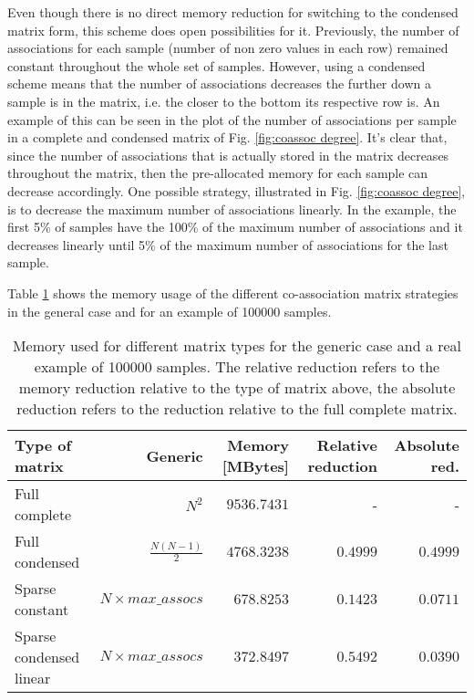 Even though there is no direct memory reduction for switching to the condensed matrix form, this scheme does open possibilities for it.
Previously, the number of associations for each sample (number of non zero values in each row) remained constant throughout the whole set of samples.
However, using a condensed scheme means that the number of associations decreases the further down a sample is in the matrix, i.e. the closer to the bottom its respective row is.
An example of this can be seen in the plot of the number of associations per sample in a complete and condensed matrix of Fig. \ref{fig:coassoc degree}.
It's clear that, since the number of associations that is actually stored in the matrix decreases throughout the matrix, then the pre-allocated memory for each sample can decrease accordingly.
One possible strategy, illustrated in Fig. \ref{fig:coassoc degree}, is to decrease the maximum number of associations linearly.
In the example, the first 5\% of samples have the 100\% of the maximum number of associations and it decreases linearly until 5\% of the maximum number of associations for the last sample.

Table \ref{tab:mat type memory} shows the memory usage of the different co-association matrix strategies in the general case and for an example of 100000 samples.

\begin{table}[hbtp]
\centering
\caption{Memory used for different matrix types for the generic case and a real example of 100000 samples. The relative reduction refers to the memory reduction relative to the type of matrix above, the absolute reduction refers to the reduction relative to the full complete matrix.}
\label{tab:mat type memory}
\begin{tabular}{l|r|r|r|r}
\toprule
Type of matrix          & Generic                & Memory {[}MBytes{]}    & Relative reduction & Absolute red. \\
\midrule
Full complete           & $N^2$                  & $9536.7431$              & -                  & -             \\
Full condensed          & $\frac{N(N-1)}{2}$     & $4768.3238$              & $0.4999$     & $0.4999$      \\
Sparse constant         & $N \times max\_assocs$ & $678.8253$               & $0.1423$           & $0.0711$      \\
Sparse condensed linear & $N \times max\_assocs$ & $372.8497$               & $0.5492$           & $0.0390$      \\
\bottomrule
\end{tabular}
\end{table}


